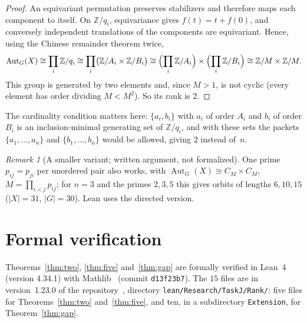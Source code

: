 \documentclass[11pt]{article}
\theoremstyle{remark}
\newtheorem{remark}{Remark}
\newcommand{\repoversion}{1.23.0}
\newcommand{\Aut}{\operatorname{Aut}}
\begin{document}
\begin{proof}
An equivariant permutation preserves stabilizers and therefore maps each
component to itself. On $\mathbb Z/q_i$, equivariance gives
$f(t)=t+f(0)$, and conversely independent translations of the components are
equivariant. Hence, using the Chinese remainder theorem twice,
\[
\Aut_G(X)\cong\prod_i\mathbb Z/q_i\cong\prod_i\bigl(\mathbb Z/A_i\times
\mathbb Z/B_i\bigr)\cong\Bigl(\prod_i\mathbb Z/A_i\Bigr)\times
\Bigl(\prod_i\mathbb Z/B_i\Bigr)\cong\mathbb Z/M\times\mathbb Z/M .
\]
This group is generated by two elements and, since $M>1$, is not cyclic (every
element has order dividing $M<M^2$). So its rank is $2$.
\end{proof}

The cardinality condition matters here: $\{a_i,b_i\}$ with $a_i$ of order
$A_i$ and $b_i$ of order $B_i$ is an inclusion-minimal generating set of
$\mathbb Z/q_i$, and with these sets the packets $\{a_1,\dots,a_n\}$ and
$\{b_1,\dots,b_n\}$ would be allowed, giving $2$ instead of~$n$.

\begin{remark}[A smaller variant; written argument, not formalized]
One prime $p_{ij}=p_{ji}$ per unordered pair also works, with
$\Aut_G(X)\cong C_M\times C_M$, $M=\prod_{i<j}p_{ij}$; for $n=3$ and the primes
$2,3,5$ this gives orbits of lengths $6,10,15$ ($|X|=31$, $|G|=30$). Lean uses
the directed version.
\end{remark}


\section{Formal verification}\label{sec:lean}

Theorems~\ref{thm:two}, \ref{thm:five} and~\ref{thm:gap} are formally verified
in Lean~4 (version 4.34.1) with Mathlib~\cite{mathlib} (commit
\texttt{d13f23b7}). The $15$ files are in version~\repoversion{} of the
repository~\cite{repo}, directory \texttt{lean/Research/TaskJ/Rank/}: five files for
Theorems~\ref{thm:two} and~\ref{thm:five}, and ten, in a subdirectory
\texttt{Extension}, for Theorem~\ref{thm:gap}.
\end{document}
